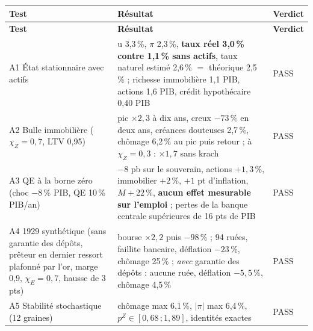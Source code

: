 \documentclass[11pt,a4paper]{article}
\begin{document}
\begin{center}\small
\begin{longtable}{p{4.0cm}p{8.4cm}p{1.4cm}}
\toprule
\textbf{Test} & \textbf{Résultat} & \textbf{Verdict}\\
\midrule
\endfirsthead
\toprule
\textbf{Test} & \textbf{Résultat} & \textbf{Verdict}\\
\midrule
\endhead
A1 État stationnaire avec actifs & u 3,3\,\%, $\pi$ 2,3\,\%, \textbf{taux réel 3,0\,\% contre 1,1\,\% sans actifs}, taux naturel estimé 2,6\,\% $=$ théorique 2,5\,\% ; richesse immobilière 1,1 PIB, actions 1,6 PIB, crédit hypothécaire 0,40 PIB & PASS\\
A2 Bulle immobilière ($\chi_Z=0{,}7$, LTV 0,95) & pic $\times2{,}3$ à dix ans, creux $-73\,\%$ en deux ans, créances douteuses 2,7\,\%, chômage 6,2\,\% au pic puis retour ; à $\chi_Z=0{,}3$ : $\times1{,}7$ sans krach & PASS\\
A3 QE à la borne zéro (choc $-8\,\%$ PIB, QE 10\,\% PIB/an) & $-8$ pb sur le souverain, actions $+1{,}3\,\%$, immobilier $+2\,\%$, $+1$ pt d'inflation, $M+22\,\%$, \textbf{aucun effet mesurable sur l'emploi} ; pertes de la banque centrale supérieures de 16 pts de PIB & PASS\\
A4 1929 synthétique (sans garantie des dépôts, prêteur en dernier ressort plafonné par l'or, marge 0,9, $\chi_E=0{,}7$, hausse de 3 pts) & bourse $\times2{,}2$ puis $-98\,\%$ ; 94 ruées, faillite bancaire, déflation $-23\,\%$, chômage 25\,\% ; \emph{avec} garantie des dépôts : aucune ruée, déflation $-5{,}5\,\%$, chômage 4,5\,\% & PASS\\
A5 Stabilité stochastique (12 graines) & chômage max 6,1\,\%, $|\pi|$ max 6,4\,\%, $p^Z\in[0{,}68\,;1{,}89]$, identités exactes & PASS\\
\bottomrule
\end{longtable}
\end{center}
\end{document}
